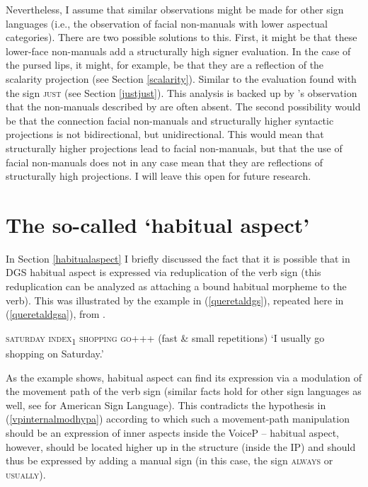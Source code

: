 Nevertheless, I assume that similar observations might be made for other sign languages (i.e., the observation of facial non-manuals with lower aspectual categories). There are two possible solutions to this. First, it might be that these lower-face non-manuals add a structurally high signer evaluation. In the case of the pursed lips, it might, for example, be that they are a reflection of the scalarity projection (see Section \ref{scalarity}). Similar to the evaluation found with the sign \textsc{just} (see Section \ref{justjust}). This analysis is backed up by \citeauthor{boven2018throughaspect}'s observation that the non-manuals described by \citet{hoitingslobin2001typological} are often absent. The second possibility would be that the connection facial non-manuals and structurally higher syntactic projections is not bidirectional, but unidirectional. This would mean that structurally higher projections lead to facial non-manuals, but that the use of facial non-manuals does not in any case mean that they are reflections of structurally high projections. I will leave this open for future research.


\section{The so-called `habitual aspect'}\label{habitualtwo}
In Section \ref{habitualaspect} I briefly discussed the fact that it is possible that in DGS habitual aspect is expressed via reduplication of the verb sign (this reduplication can be analyzed as attaching a bound habitual morpheme to the verb). This was illustrated by the example in (\ref{queretaldgs}), repeated here in (\ref{queretaldgsa}), from \citet[225]{signgram2017}.

\begin{exe}
\ex \textsc{saturday index\textsubscript{1} shopping go+++} (fast \& small repetitions)
\glt `I usually go shopping on Saturday.'\label{queretaldgsa}
\end{exe}

\noindent As the example shows, habitual aspect can find its expression via a modulation of the movement path of the verb sign (similar facts hold for other sign languages as well, see \citealt{wilbur2009productive} for American Sign Language). This contradicts the hypothesis in (\ref{vpinternalmodhypa}) according to which such a movement-path manipulation should be an expression of inner aspects inside the VoiceP -- habitual aspect, however, should be located higher up in the structure (inside the IP) and should thus be expressed by adding a manual sign (in this case, the sign \textsc{always} or \textsc{usually}).

